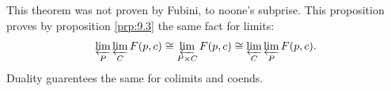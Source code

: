 This theorem was not proven by Fubini, to noone's subprise. This proposition proves by proposition \ref{prp:9.3} the same fact for limits:
\[
	\varprojlim_P \varprojlim _C F(p,c) \cong \varprojlim_{P\times C} F(p,c) \cong \varprojlim_C \varprojlim _P F(p,c)
.\]
Duality guarentees the same for colimits and coends.
